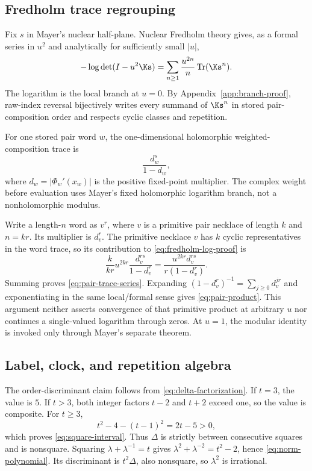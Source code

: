 \subsection{Fredholm trace regrouping}
\label{app:fredholm-proof}

Fix $s$ in Mayer's nuclear half-plane.  Nuclear Fredholm theory gives, as a
formal series in $u^2$ and analytically for sufficiently small $|u|$,
\begin{equation}
  -\log\det(I-u^2\Ks)
  =\sum_{n\ge1}\frac{u^{2n}}{n}\operatorname{Tr}(\Ks^n).
  \label{eq:fredholm-log-proof}
\end{equation}
The logarithm is the local branch at $u=0$.  By
Appendix~\ref{app:branch-proof}, raw-index reversal bijectively writes every
summand of $\Ks^n$ in stored pair-composition order and respects cyclic
classes and repetition.

For one stored pair word $w$, the one-dimensional holomorphic
weighted-composition trace is
\begin{equation}
  \frac{d_w^s}{1-d_w},
  \label{eq:composition-trace}
\end{equation}
where $d_w=|\Phi_w'(x_w)|$ is the positive fixed-point multiplier.  The
complex weight before evaluation uses Mayer's fixed holomorphic logarithm
branch, not a nonholomorphic modulus.

Write a length-$n$ word as $v^r$, where $v$ is a primitive pair necklace of
length $k$ and $n=kr$.  Its multiplier is $d_v^r$.  The primitive necklace
$v$ has $k$ cyclic representatives in the word trace, so its contribution to
\eqref{eq:fredholm-log-proof} is
\[
  \frac{k}{kr}u^{2kr}\frac{d_v^{rs}}{1-d_v^r}
  =\frac{u^{2kr}d_v^{rs}}{r(1-d_v^r)}.
\]
Summing proves \eqref{eq:pair-trace-series}.  Expanding
$(1-d_v^r)^{-1}=\sum_{j\ge0}d_v^{jr}$ and exponentiating in the same
local/formal sense gives \eqref{eq:pair-product}.  This argument neither
asserts convergence of that primitive product at arbitrary $u$ nor continues
a single-valued logarithm through zeros.  At $u=1$, the modular identity is
invoked only through Mayer's separate theorem.

\subsection{Label, clock, and repetition algebra}
\label{app:algebra-proof}

The order-discriminant claim follows from
\eqref{eq:delta-factorization}.  If $t=3$, the value is $5$.  If $t>3$,
both integer factors $t-2$ and $t+2$ exceed one, so the value is composite.
For $t\ge3$,
\[
  t^2-4-(t-1)^2=2t-5>0,
\]
which proves \eqref{eq:square-interval}.  Thus $\Delta$ is strictly between
consecutive squares and is nonsquare.  Squaring
$\lambda+\lambda^{-1}=t$ gives
$\lambda^2+\lambda^{-2}=t^2-2$, hence \eqref{eq:norm-polynomial}.  Its
discriminant is $t^2\Delta$, also nonsquare, so $\lambda^2$ is irrational.

